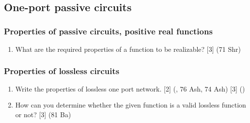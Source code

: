 \documentclass[12pt]{article}
\begin{document}
	\subsection{One-port passive circuits}
		\subsubsection{Properties of passive circuits, positive real functions}
			\begin{enumerate}[noitemsep, topsep=0pt]
				\item What are the required properties of a function to be realizable? \hfill [3] (71 Shr)
			\end{enumerate}
			
		\subsubsection{Properties of lossless circuits}
			\begin{enumerate}[noitemsep, topsep=0pt]
				\item Write the properties of lossless one port network. \hfill [2] (, 76 Ash, 74 Ash) [3] ()
				
				\item How can you determine whether the given function is a valid lossless function or not? \hfill [3] (81 Ba)
			\end{enumerate}
\end{document}
